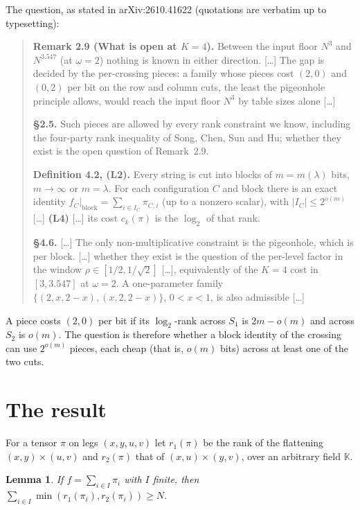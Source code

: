 \documentclass[11pt]{article}
\newtheorem{lemma}{Lemma}
\theoremstyle{remark}
\newcommand{\K}{\mathbb{K}}
\begin{document}
The question, as stated in arXiv:2610.41622 (quotations are verbatim up to typesetting):
\begin{quote}\small
\textbf{Remark 2.9 (What is open at $K=4$).} Between the input floor $N^3$ and $N^{3.547}$ (at $\omega=2$) nothing is known in either direction. [\dots] The gap is decided by the per-crossing pieces: a family whose pieces cost $(2,0)$ and $(0,2)$ per bit on the row and column cuts, the least the pigeonhole principle allows, would reach the input floor $N^3$ by table sizes alone [\dots]

\textbf{\S2.5.} Such pieces are allowed by every rank constraint we know, including the four-party rank inequality of Song, Chen, Sun and Hu; whether they exist is the open question of Remark~2.9.

\textbf{Definition 4.2, (L2).} Every string is cut into blocks of $m=m(\lambda)$ bits, $m\to\infty$ or $m=\lambda$. For each configuration $C$ and block there is an exact identity $f_C|_{\mathrm{block}}=\sum_{i\in I_C}\pi_{C,i}$ (up to a nonzero scalar), with $|I_C|\le 2^{o(m)}$ [\dots] \textbf{(L4)} [\dots] its cost $c_k(\pi)$ is the $\log_2$ of that rank.

\textbf{\S4.6.} [\dots] The only non-multiplicative constraint is the pigeonhole, which is per block. [\dots] whether they exist is the question of the per-level factor in the window $\rho\in[1/2,1/\sqrt2]$ [\dots], equivalently of the $K=4$ cost in $[3,3.547]$ at $\omega=2$. A one-parameter family $\{(2,x,2-x),(x,2,2-x)\}$, $0<x<1$, is also admissible [\dots]
\end{quote}
A piece costs $(2,0)$ per bit if its $\log_2$-rank across $S_1$ is $2m-o(m)$ and across $S_2$ is $o(m)$.
The question is therefore whether a block identity of the crossing can use $2^{o(m)}$ pieces, each cheap (that is, $o(m)$ bits) across at least one of the two cuts.

\section{The result}

For a tensor $\pi$ on legs $(x,y,u,v)$ let $r_1(\pi)$ be the rank of the flattening $(x,y)\times(u,v)$ and $r_2(\pi)$ that of $(x,u)\times(y,v)$, over an arbitrary field $\K$.

\begin{lemma}\label{lem:main}
If $f=\sum_{i\in I}\pi_i$ with $I$ finite, then $\sum_{i\in I}\min(r_1(\pi_i),r_2(\pi_i))\ge N$.
\end{lemma}
\end{document}
